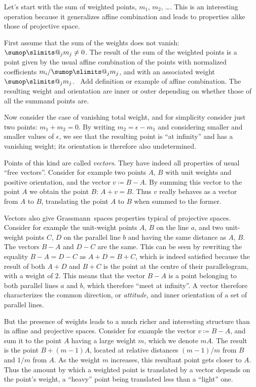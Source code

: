 \documentclass[\ifafour a4paper,12pt,\else a5paper,10pt,\fi%
onecolumn,oneside,article,%
british%
]{memoir}
\makeatletter
\theoremstyle{remark}
\theoremstyle{innote}
\def\sum{\DOTSI\sumop\slimits@}
\newcommand*{\defd}{\coloneqq}
\renewcommand*{\|}{\nonscript\,\vert\nonscript\;\mathopen{}}
\newcommand*{\puzzle}{{\fontencoding{U}\fontfamily{fontawesometwo}\selectfont\symbol{225}}}
\newcommand{\mynote}[1]{ {\color{notecolour}\puzzle\ #1}}
\newcommand*{\gm}{Grassmann}
\newcommand*{\ym}{m}
\newcommand*{\ya}{a}
\newcommand*{\yb}{b}
\makeatother
\begin{document}
Let's start with the sum of weighted points, $\ym_1$, $\ym_2$, \ldots. This
is an interesting operation because it generalizes affine combination and
leads to properties alike those of projective space.

First assume that the sum of the weights does not vanish:
$\sum_j\ym_j \ne 0$. The result of the sum of the weighted points is a
point given by the usual affine combination of the points with normalized
coefficients $\ym_i/\sum_j\ym_j$, and with an associated weight
$\sum_j\ym_j$. \mynote{Add definition or example of affine combination}.
The resulting weight and orientation are inner or outer depending on
whether those of all the summand points are.

Now consider the case of vanishing total weight, and for simplicity
consider just two points: $\ym_1 + \ym_2 = 0$. By writing $\ym_2 = \epsilon
-\ym_1$ and considering smaller and smaller values of $\epsilon$, we see
that the resulting point is \enquote{at infinity} and has a vanishing
weight; its orientation is therefore also undetermined.

Points of this kind are called \emph{vectors}. They have indeed all
properties of usual \enquote{free vectors}. Consider for example two points
$A$, $B$ with unit weights and positive orientation, and the vector
$v \defd B-A$. By summing this vector to the point $A$ we obtain the point
$B$: $A+v = B$. Thus $v$ really behaves as a vector from $A$ to $B$,
translating the point $A$ to $B$ when summed to the former.

Vectors also give \gm\ spaces properties typical of projective spaces.
Consider for example the unit-weight points $A$, $B$ on the line $\ya$, and
two unit-weight points $C$, $D$ on the parallel line $\yb$ and having the
same distance as $A$, $B$. The vectors $B-A$ and $D-C$ are the same. This
can be seen by rewriting the equality $B-A = D-C$ as $A+D = B+C$, which is
indeed satisfied because the result of both $A+D$ and $B+C$ is the point at
the centre of their parallelogram, with a weight of $2$. This means that
the vector $B-A$ is a point belonging to both parallel lines $\ya$ and
$\yb$, which therefore \enquote{meet at infinity}. A vector therefore
characterizes the common direction, or \emph{attitude}, and inner
orientation of a set of parallel lines.

But the presence of weights leads to a much richer and interesting
structure than in affine and projective spaces. Consider for example the
vector $v \defd B-A$, and sum it to the point $A$ having a large weight
$\ym$, which we denote $\ym A$. The result is the point $B+(\ym-1)A$,
located at relative distances $(\ym-1)/\ym$ from $B$ and $1/\ym$ from $A$.
As the weight $\ym$ increases, this resultant point gets closer to $A$.
Thus the amount by which a weighted point is translated by a vector depends
on the point's weight, a \enquote{heavy} point being translated less than a
\enquote{light} one.
\end{document}
